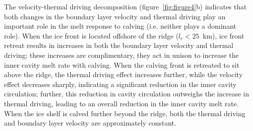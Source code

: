 \documentclass[draft]{agujournal2019}
\begin{document}
The velocity-thermal driving decomposition (figure~\ref{fig:figure4}b) indicates that both changes in the boundary layer velocity and thermal driving play an important role in the melt response to calving (i.e. neither plays a dominant role).  When the ice front is located offshore of the ridge ($l_c < 25$~km), ice front retreat results in increases in both the boundary layer velocity and thermal driving; these increases are complimentary, they act in unison to increase the inner cavity melt rate with calving. When the calving front is retreated to sit above the ridge, the thermal driving effect increases further, while the velocity effect decreases sharply, indicating a significant reduction in the inner cavity circulation; further, this reduction in cavity circulation outweighs the increase in thermal driving, leading to an overall reduction in the inner cavity melt rate. When the ice shelf is calved further beyond the ridge, both the thermal driving and boundary layer velocity are approximately constant.
\end{document}
